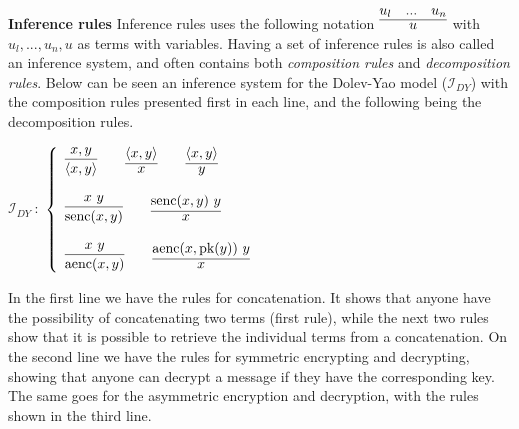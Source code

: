 \noindent \textbf{Inference rules}  \qquad
Inference rules uses the following notation $\infer{u} {u_l & ... & u_n}$ with $u_l,...,u_n, u$ as terms with variables. Having a set of inference rules is also called an inference system, and often contains both \textit{composition rules} and \textit{decomposition rules}. Below can be seen an inference system for the Dolev-Yao model ($\mathcal{I}_{DY}$) with the composition rules presented first in each line, and the following being the decomposition rules. 
\begin{center}
$\mathcal{I}_{DY}\ :$
\begin{math}
  \left\{
    \begin{array}{l l l}
      \infer{\langle x, y \rangle}{x,y} \qquad \infer{x}{\langle x, y \rangle} \qquad \infer{y}{\langle x, y \rangle} \\ \\
      \infer{\text{senc}(x, y)}{x\ y} \qquad  \infer{x}{\text{senc}(x, y)\ y} \\ \\
      \infer{\text{aenc}(x, y)}{x\ y} \qquad \infer{x}{\text{aenc}(x, \text{pk}(y))\ y}
    \end{array}
  \right.
\end{math}
\end{center}
\bigbreak
\noindent In the first line we have the rules for concatenation. It shows that anyone have the possibility of concatenating two terms (first rule), while the next two rules show that it is possible to retrieve the individual terms from a concatenation. 
On the second line we have the rules for symmetric encrypting and decrypting, showing that anyone can decrypt a message if they have the corresponding key. The same goes for the asymmetric encryption and decryption, with the rules shown in the third line. \\

